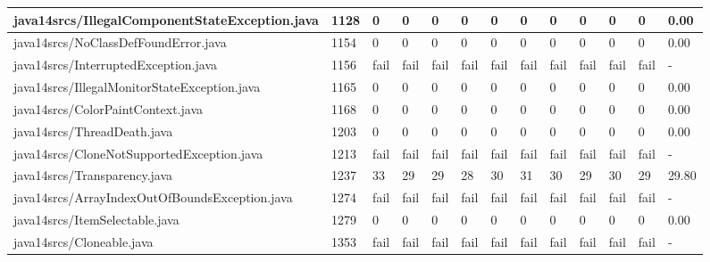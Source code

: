 \begin{tabular}{|l|l|l|l|l|l|l|l|l|l|l|l|l|}
\hline
java14srcs/IllegalComponentStateException.java     & 1128        & 0         & 0         & 0         & 0         & 0         & 0         & 0         & 0         & 0         & 0         & 0.00      \\
\hline
java14srcs/NoClassDefFoundError.java               & 1154        & 0         & 0         & 0         & 0         & 0         & 0         & 0         & 0         & 0         & 0         & 0.00      \\
\hline
java14srcs/InterruptedException.java               & 1156        & fail      & fail      & fail      & fail      & fail      & fail      & fail      & fail      & fail      & fail      & -         \\
\hline
java14srcs/IllegalMonitorStateException.java       & 1165        & 0         & 0         & 0         & 0         & 0         & 0         & 0         & 0         & 0         & 0         & 0.00      \\
\hline
java14srcs/ColorPaintContext.java                  & 1168        & 0         & 0         & 0         & 0         & 0         & 0         & 0         & 0         & 0         & 0         & 0.00      \\
\hline
java14srcs/ThreadDeath.java                        & 1203        & 0         & 0         & 0         & 0         & 0         & 0         & 0         & 0         & 0         & 0         & 0.00      \\
\hline
java14srcs/CloneNotSupportedException.java         & 1213        & fail      & fail      & fail      & fail      & fail      & fail      & fail      & fail      & fail      & fail      & -         \\
\hline
java14srcs/Transparency.java                       & 1237        & 33        & 29        & 29        & 28        & 30        & 31        & 30        & 29        & 30        & 29        & 29.80     \\
\hline
java14srcs/ArrayIndexOutOfBoundsException.java     & 1274        & fail      & fail      & fail      & fail      & fail      & fail      & fail      & fail      & fail      & fail      & -         \\
\hline
java14srcs/ItemSelectable.java                     & 1279        & 0         & 0         & 0         & 0         & 0         & 0         & 0         & 0         & 0         & 0         & 0.00      \\
\hline
java14srcs/Cloneable.java                          & 1353        & fail      & fail      & fail      & fail      & fail      & fail      & fail      & fail      & fail      & fail      & -         \\

\end{tabular}
